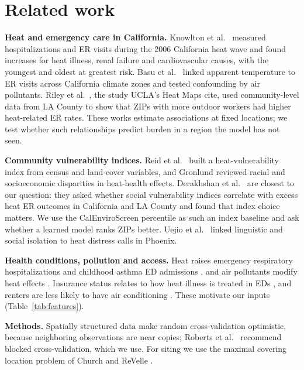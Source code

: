 \documentclass[10pt]{article}
\begin{document}
\section{Related work}
\label{sec:related}

\textbf{Heat and emergency care in California.} Knowlton et al.\ \cite{knowlton2009} measured hospitalizations and ER visits during the 2006 California heat wave and found increases for heat illness, renal failure and cardiovascular causes, with the youngest and oldest at greatest risk. Basu et al.\ \cite{basu2012} linked apparent temperature to ER visits across California climate zones and tested confounding by air pollutants. Riley et al.\ \cite{riley2018}, the study UCLA's Heat Maps cite, used community-level data from LA County to show that ZIPs with more outdoor workers had higher heat-related ER rates. These works estimate associations at fixed locations; we test whether such relationships predict burden in a region the model has not seen.

\textbf{Community vulnerability indices.} Reid et al.\ \cite{reid2009} built a heat-vulnerability index from census and land-cover variables, and Gronlund \cite{gronlund2014} reviewed racial and socioeconomic disparities in heat-health effects. Derakhshan et al.\ \cite{derakhshan2024} are closest to our question: they asked whether social vulnerability indices correlate with excess heat ER outcomes in California and LA County and found that index choice matters. We use the CalEnviroScreen percentile as such an index baseline and ask whether a learned model ranks ZIPs better. Uejio et al.\ \cite{uejio2011} linked linguistic and social isolation to heat distress calls in Phoenix.

\textbf{Health conditions, pollution and access.} Heat raises emergency respiratory hospitalizations \cite{anderson2013} and childhood asthma ED admissions \cite{xu2013}, and air pollutants modify heat effects \cite{analitis2014}. Insurance status relates to how heat illness is treated in EDs \cite{hess2014}, and renters are less likely to have air conditioning \cite{scott2025}. These motivate our inputs (Table~\ref{tab:features}).

\textbf{Methods.} Spatially structured data make random cross-validation optimistic, because neighboring observations are near copies; Roberts et al.\ \cite{roberts2017} recommend blocked cross-validation, which we use. For siting we use the maximal covering location problem of Church and ReVelle \cite{church1974}.
\end{document}
